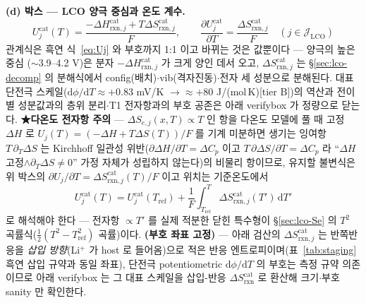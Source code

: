 \documentclass[11pt,a4paper]{article}
\newcommand{\dd}{\mathrm{d}}
\newcommand{\rxn}{\mathrm{rxn}}
\begin{document}
\textbf{(d) 박스 — LCO 양극 중심과 온도 계수.}
\begin{equation}
\boxed{\;
U_j^\mathrm{cat}(T)=\frac{-\Delta H_{\rxn,j}^\mathrm{cat}+T\Delta S_{\rxn,j}^\mathrm{cat}}{F},
\qquad
\frac{\partial U_j^\mathrm{cat}}{\partial T}=\frac{\Delta S_{\rxn,j}^\mathrm{cat}}{F}
\quad(j\in\mathcal J_\mathrm{LCO})\;}
\label{eq:lco-dUdT}
\end{equation}
관계식은 흑연 식~\eqref{eq:Uj} 와 부호까지 1:1 이고 바뀌는 것은 값뿐이다 — 양극의 높은 중심
($\sim$3.9--4.2 V)은 분자 $-\Delta H_{\rxn,j}^\mathrm{cat}$ 가 크게 양인 데서 오고, $\Delta S_{\rxn,j}^\mathrm{cat}$
는 \S\ref{sec:lco-decomp} 의 분해식에서 config(배치)$\cdot$vib(격자진동)$\cdot$전자 세 성분으로 분해된다.
대표 단전극 스케일($\dd\phi/\dd T\approx+0.83$ mV/K $\to\approx+80$ J/(mol\,K)[tier B])의 역산과
전이별 성분값과의 층위 분리$\cdot$T1 전자항과의 부호 공존은 아래 verifybox 가 정량으로 닫는다. \textbf{★다온도 전자항 주의} — $\Delta S_{e,j}(x,T)\propto T$
인 항을 다온도 모델에 풀 때 고정 $\Delta H$ 로 $U_j(T)=(-\Delta H+T\Delta S(T))/F$ 를 기계 미분하면 생기는
잉여항 $T\,\partial_T\Delta S$ 는 Kirchhoff 일관성 위반($\partial\Delta H/\partial T=\Delta C_p$ 이고
$T\,\partial\Delta S/\partial T=\Delta C_p$ 라 ``$\Delta H$ 고정$\wedge\partial_T\Delta S\ne0$'' 가정 자체가
성립하지 않는다)의 비물리 항이므로, 유지할 불변식은 위 박스의
$\partial U_j/\partial T=\Delta S_{\rxn,j}^\mathrm{cat}(T)/F$ 이고 위치는 기준온도에서
\[
U_j^\mathrm{cat}(T)=U_j^\mathrm{cat}(T_\mathrm{ref})+\frac1F\int_{T_\mathrm{ref}}^{T}\Delta S_{\rxn,j}^\mathrm{cat}(T')\,\dd T'
\]
로 해석해야 한다 — 전자항 $\propto T'$ 를 실제 적분한 닫힌 특수형이 \S\ref{sec:lco-Se} 의
$T^2$ 곡률식($\tfrac12(T^2-T_\mathrm{ref}^2)$ 곡률)이다. \textbf{(부호 좌표 고정)} — 아래 검산의 $\Delta S_{\rxn,j}^\mathrm{cat}$ 는 반쪽반응을
\emph{삽입 방향}(Li$^+$ 가 host 로 들어옴)으로 적은 반응 엔트로피이며(표~\ref{tab:staging} 흑연 삽입 규약과
동일 좌표), 단전극 potentiometric $\dd\phi/\dd T$ 의 부호는 측정 규약 의존이므로 아래 verifybox 는 그
대표 스케일을 삽입-반응 $\Delta S_{\rxn}^\mathrm{cat}$ 로 환산해 크기$\cdot$부호 sanity 만 확인한다.
\end{document}
